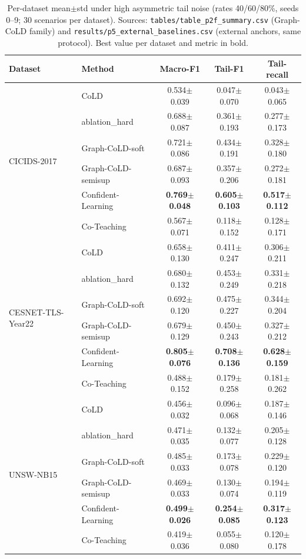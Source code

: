 \documentclass[preprint,3p,times]{elsarticle}
\begin{document}
\begin{table}[t]
\centering
\caption{Per-dataset mean$\pm$std under high asymmetric tail noise (rates 40/60/80\%,
seeds 0--9; 30 scenarios per dataset). Sources: \texttt{tables/table\_p2f\_summary.csv}
(Graph-CoLD family) and \texttt{results/p5\_external\_baselines.csv} (external anchors,
same protocol). Best value per dataset and metric in bold.}
\label{tab:main}
\small
\begin{tabular}{llccc}
\toprule
Dataset & Method & Macro-F1 & Tail-F1 & Tail-recall \\
\midrule
\multirow{6}{*}{CICIDS-2017}
 & CoLD          & 0.534$\pm$0.039 & 0.047$\pm$0.070 & 0.043$\pm$0.065 \\
 & ablation\_hard & 0.688$\pm$0.087 & 0.361$\pm$0.193 & 0.277$\pm$0.173 \\
 & Graph-CoLD-soft & 0.721$\pm$0.086 & 0.434$\pm$0.191 & 0.328$\pm$0.180 \\
 & Graph-CoLD-semisup & 0.687$\pm$0.093 & 0.357$\pm$0.206 & 0.272$\pm$0.181 \\
 & Confident-Learning & \textbf{0.769$\pm$0.048} & \textbf{0.605$\pm$0.103} & \textbf{0.517$\pm$0.112} \\
 & Co-Teaching & 0.567$\pm$0.071 & 0.118$\pm$0.152 & 0.128$\pm$0.171 \\
\midrule
\multirow{6}{*}{CESNET-TLS-Year22}
 & CoLD          & 0.658$\pm$0.130 & 0.411$\pm$0.247 & 0.306$\pm$0.211 \\
 & ablation\_hard & 0.680$\pm$0.132 & 0.453$\pm$0.249 & 0.331$\pm$0.218 \\
 & Graph-CoLD-soft & 0.692$\pm$0.120 & 0.475$\pm$0.227 & 0.344$\pm$0.204 \\
 & Graph-CoLD-semisup & 0.679$\pm$0.129 & 0.450$\pm$0.243 & 0.327$\pm$0.212 \\
 & Confident-Learning & \textbf{0.805$\pm$0.076} & \textbf{0.708$\pm$0.136} & \textbf{0.628$\pm$0.159} \\
 & Co-Teaching & 0.488$\pm$0.152 & 0.179$\pm$0.258 & 0.181$\pm$0.262 \\
\midrule
\multirow{6}{*}{UNSW-NB15}
 & CoLD          & 0.456$\pm$0.032 & 0.096$\pm$0.068 & 0.187$\pm$0.146 \\
 & ablation\_hard & 0.471$\pm$0.035 & 0.132$\pm$0.077 & 0.205$\pm$0.128 \\
 & Graph-CoLD-soft & 0.485$\pm$0.033 & 0.173$\pm$0.078 & 0.229$\pm$0.120 \\
 & Graph-CoLD-semisup & 0.469$\pm$0.033 & 0.130$\pm$0.074 & 0.194$\pm$0.119 \\
 & Confident-Learning & \textbf{0.499$\pm$0.026} & \textbf{0.254$\pm$0.085} & \textbf{0.317$\pm$0.123} \\
 & Co-Teaching & 0.419$\pm$0.036 & 0.055$\pm$0.080 & 0.120$\pm$0.178 \\
\bottomrule
\end{tabular}
\end{table}
\end{document}
